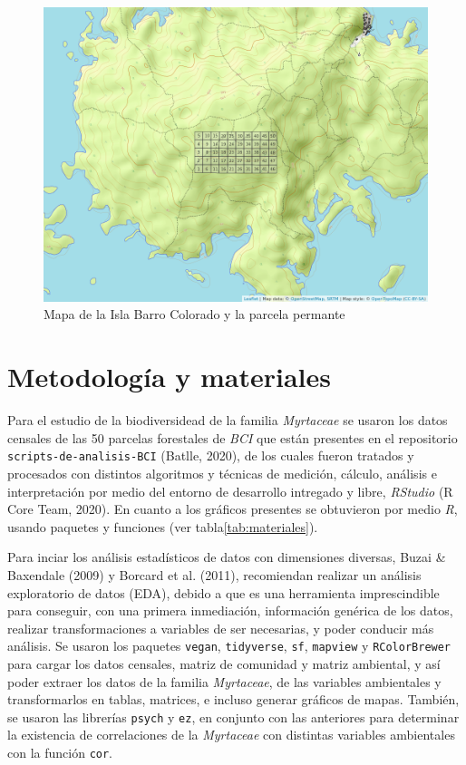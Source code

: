 \documentclass[11pt,]{article}
\begin{document}
\begin{figure}
\centering
\includegraphics[width=1.00000\textwidth]{mapa_cuadros2.png}
\caption{Mapa de la Isla Barro Colorado y la parcela
permante\label{fig:bci_map}}
\end{figure}

\section{Metodología y materiales}\label{metodologuxeda-y-materiales}

Para el estudio de la biodiversidead de la familia \emph{Myrtaceae} se
usaron los datos censales de las 50 parcelas forestales de \emph{BCI}
que están presentes en el repositorio \texttt{scripts-de-analisis-BCI}
(Batlle, 2020), de los cuales fueron tratados y procesados con distintos
algoritmos y técnicas de medición, cálculo, análisis e interpretación
por medio del entorno de desarrollo intregado y libre, \emph{RStudio} (R
Core Team, 2020). En cuanto a los gráficos presentes se obtuvieron por
medio \emph{R}, usando paquetes y funciones (ver
tabla\ref{tab:materiales}).

Para inciar los análisis estadísticos de datos con dimensiones diversas,
Buzai \& Baxendale (2009) y Borcard et al. (2011), recomiendan realizar
un análisis exploratorio de datos (EDA), debido a que es una herramienta
imprescindible para conseguir, con una primera inmediación, información
genérica de los datos, realizar transformaciones a variables de ser
necesarias, y poder conducir más análisis. Se usaron los paquetes
\texttt{vegan}, \texttt{tidyverse}, \texttt{sf}, \texttt{mapview} y
\texttt{RColorBrewer} para cargar los datos censales, matriz de
comunidad y matriz ambiental, y así poder extraer los datos de la
familia \emph{Myrtaceae}, de las variables ambientales y transformarlos
en tablas, matrices, e incluso generar gráficos de mapas. También, se
usaron las librerías \texttt{psych} y \texttt{ez}, en conjunto con las
anteriores para determinar la existencia de correlaciones de la
\emph{Myrtaceae} con distintas variables ambientales con la función
\texttt{cor}.
\end{document}
